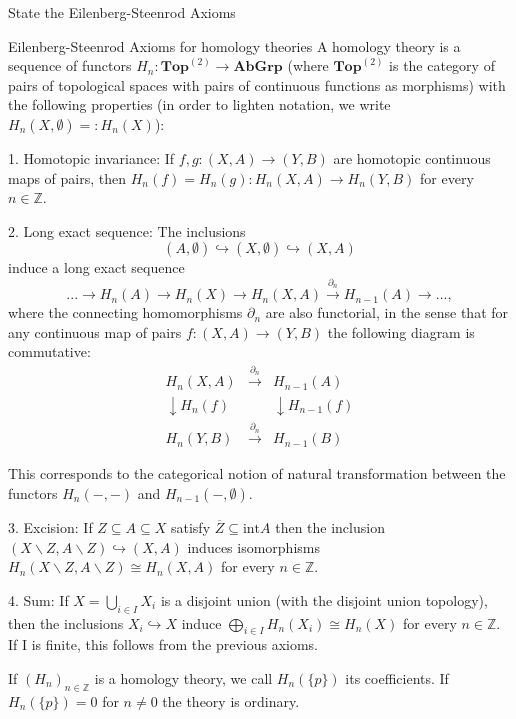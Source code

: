 State the Eilenberg-Steenrod Axioms

Eilenberg-Steenrod Axioms for homology theories
A homology theory is a sequence of functors \(H_n \colon \textbf{Top}^{(2)} \to \textbf{AbGrp}\) 
(where \(\textbf{Top}^{(2)}\) is the category of pairs of topological spaces with pairs of continuous functions as morphisms)
with the following properties (in order to lighten notation, we write \(H_n(X, \emptyset) =: H_n(X)\)): 

1. Homotopic invariance: 
If \(f, g \colon (X, A) \to (Y, B)\) are homotopic continuous maps of pairs, 
then \(H_n(f) = H_n(g) \colon H_n(X, A) \to H_n(Y, B)\) for every \(n \in \mathbb{Z}\).

2. Long exact sequence: 
The inclusions 
\[
(A, \emptyset) \hookrightarrow (X, \emptyset) \hookrightarrow (X, A)
\] 
induce a long exact sequence
\[
... \longrightarrow H_n(A) \longrightarrow H_n(X) \longrightarrow H_n(X, A) \xrightarrow{\partial_n} H_{n-1}(A) \longrightarrow ... ,
\]
where the connecting homomorphisms \(\partial_n\) are also functorial, 
in the sense that for any continuous map of pairs \(f \colon (X, A) \to (Y, B)\) 
the following diagram is commutative:
\[
\begin{array}{ccc}
H_n(X, A) & \xrightarrow{\partial_n} & H_{n-1}(A) \\
\downarrow H_n(f) & & \downarrow H_{n-1}(f) \\
H_n(Y, B) & \xrightarrow{\partial_n} & H_{n-1}(B)
\end{array}
\]

This corresponds to the categorical notion of natural transformation between the functors \(H_n(-, -)\) and \(H_{n-1}(-, \emptyset)\).

3. Excision: 
If \(Z \subseteq A \subseteq X\) satisfy \(\overline{Z} \subseteq \text{int} A\) then the inclusion 
\((X \backslash Z, A \backslash Z) \hookrightarrow (X, A)\) induces isomorphisms 
\(H_n(X \backslash Z, A \backslash Z) \cong H_n(X, A)\) for every \(n \in \mathbb{Z}\).

4. Sum: If \(X = \bigcup_{i \in I} X_i\) is a disjoint union (with the disjoint union topology), 
then the inclusions \(X_i \hookrightarrow X\) induce \(\bigoplus_{i \in I} H_n(X_i) \cong H_n(X)\) 
for every \(n \in \mathbb{Z}\). If I is finite, this follows from the previous axioms.

If \((H_n)_{n \in \mathbb{Z}}\) is a homology theory, we call \(H_n(\{p\})\) its coefficients.
If \(H_n(\{p\}) = 0\) for \(n \neq 0\) the theory is ordinary. 

